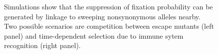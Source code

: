 \documentclass[12pt,a4paper,notitlepage,onecolumn]{article}
\begin{document}
\begin{figure}
\begin{center}
\caption{Simulations show that the suppression of fixation probability can be
generated by linkage to sweeping nonsynonymous alleles nearby. Two possible
scenarios are competition between escape mutants (left panel) and time-dependent
selection due to immune sytem recognition (right panel).}
\end{center}
\end{figure}
\end{document}

